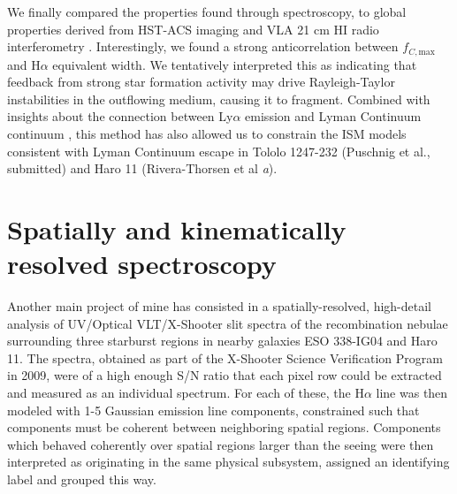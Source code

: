 \documentclass[10pt, letterpaper, headings=Large, DIV=14]{scrartcl}
\begin{document}
We finally compared the properties found through spectroscopy, to global
properties derived from HST-ACS imaging \citep{LARSII} and VLA 21 cm HI radio
interferometry \citep{LARSIII}. Interestingly, we found a strong anticorrelation
between $f_{C, \mathrm{max}}$ and H$\alpha$ equivalent width. We tentatively
interpreted this as indicating that feedback from strong star formation activity
may drive Rayleigh-Taylor instabilities in the outflowing medium, causing it to
fragment. 
Combined with insights about the connection between Ly$\alpha$
emission and Lyman Continuum continuum \citep[e.g.][]{Verhamme2015}, this method
has also allowed us to constrain the ISM models consistent with Lyman Continuum
escape in Tololo 1247-232 (Puschnig et al., submitted) and Haro 11
(Rivera-Thorsen et al \emph{a}). 


\section*{Spatially and kinematically resolved spectroscopy}

Another main project of mine has consisted in a spatially-resolved, high-detail
analysis of UV/Optical VLT/X-Shooter slit spectra of the recombination nebulae
surrounding three starburst regions in nearby galaxies ESO 338-IG04 and Haro 11.
The spectra, obtained as part of the X-Shooter Science Verification Program in
2009, were of a high enough S/N ratio that each pixel row could be extracted and
measured as an individual spectrum. For each of these, the H$\alpha$ line was
then modeled with 1-5 Gaussian emission line components, constrained such that
components must be coherent between neighboring spatial regions. Components
which behaved coherently over spatial regions larger than the seeing were then
interpreted as originating in the same physical subsystem, assigned an
identifying label and grouped this way. 
\end{document}
